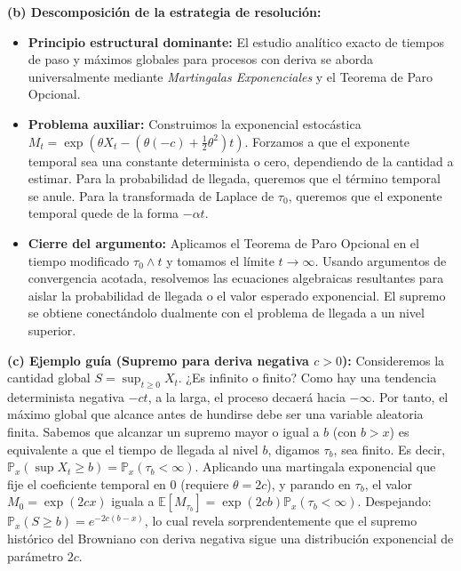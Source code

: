 \documentclass[11pt, letterpaper]{article}
\begin{document}
\begin{solucion}
    \textbf{(b) Descomposición de la estrategia de resolución:}
    \begin{itemize}
        \item[(i)] \textbf{Principio estructural dominante:} El estudio analítico exacto de tiempos de paso y máximos globales para procesos con deriva se aborda universalmente mediante \textit{Martingalas Exponenciales} y el Teorema de Paro Opcional. 
        \item[(ii)] \textbf{Problema auxiliar:} Construimos la exponencial estocástica $M_t = \exp(\theta X_t - (\theta(-c) + \frac{1}{2}\theta^2)t)$. Forzamos a que el exponente temporal sea una constante determinista o cero, dependiendo de la cantidad a estimar. Para la probabilidad de llegada, queremos que el término temporal se anule. Para la transformada de Laplace de $\tau_0$, queremos que el exponente temporal quede de la forma $-\alpha t$.
        \item[(iii)] \textbf{Cierre del argumento:} Aplicamos el Teorema de Paro Opcional en el tiempo modificado $\tau_0 \wedge t$ y tomamos el límite $t \to \infty$. Usando argumentos de convergencia acotada, resolvemos las ecuaciones algebraicas resultantes para aislar la probabilidad de llegada o el valor esperado exponencial. El supremo se obtiene conectándolo dualmente con el problema de llegada a un nivel superior.
    \end{itemize}

    \vspace{3mm}
    \textbf{(c) Ejemplo guía (Supremo para deriva negativa $c > 0$):}
    Consideremos la cantidad global $S = \sup_{t \ge 0} X_t$. ¿Es infinito o finito? Como hay una tendencia determinista negativa $-c t$, a la larga, el proceso decaerá hacia $-\infty$. Por tanto, el máximo global que alcance antes de hundirse debe ser una variable aleatoria finita.
    Sabemos que alcanzar un supremo mayor o igual a $b$ (con $b > x$) es equivalente a que el tiempo de llegada al nivel $b$, digamos $\tau_b$, sea finito. Es decir, $\mathbb{P}_x(\sup X_t \ge b) = \mathbb{P}_x(\tau_b < \infty)$.
    Aplicando una martingala exponencial que fije el coeficiente temporal en 0 (requiere $\theta = 2c$), y parando en $\tau_b$, el valor $M_0 = \exp(2cx)$ iguala a $\mathbb{E}[M_{\tau_b}] = \exp(2cb) \mathbb{P}_x(\tau_b < \infty)$. Despejando: $\mathbb{P}_x(S \ge b) = e^{-2c(b-x)}$, lo cual revela sorprendentemente que el supremo histórico del Browniano con deriva negativa sigue una distribución exponencial de parámetro $2c$.


\end{solucion}
\end{document}
